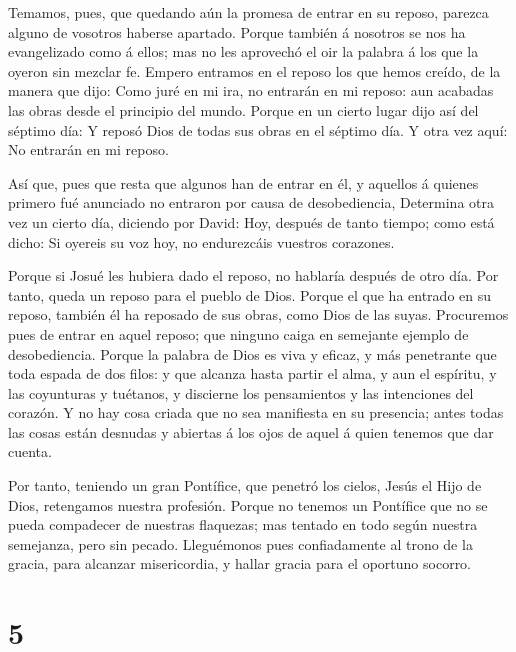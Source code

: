  Temamos, pues, que quedando aún la promesa de entrar en su
reposo, parezca alguno de vosotros haberse apartado.  Porque
también á nosotros se nos ha evangelizado como á ellos; mas no les
aprovechó el oir la palabra á los que la oyeron sin mezclar fe.
 Empero entramos en el reposo los que hemos creído, de la
manera que dijo: Como juré en mi ira, no entrarán en mi reposo: aun
acabadas las obras desde el principio del mundo.  Porque en
un cierto lugar dijo así del séptimo día: Y reposó Dios de todas sus
obras en el séptimo día.  Y otra vez aquí: No entrarán en mi
reposo.

 Así que, pues que resta que algunos han de entrar en él, y
aquellos á quienes primero fué anunciado no entraron por causa de
desobediencia,  Determina otra vez un cierto día, diciendo
por David: Hoy, después de tanto tiempo; como está dicho: Si oyereis su
voz hoy, no endurezcáis vuestros corazones.

 Porque si Josué les hubiera dado el reposo, no hablaría
después de otro día.  Por tanto, queda un reposo para el
pueblo de Dios.  Porque el que ha entrado en su reposo,
también él ha reposado de sus obras, como Dios de las suyas.
 Procuremos pues de entrar en aquel reposo; que ninguno
caiga en semejante ejemplo de desobediencia.  Porque la
palabra de Dios es viva y eficaz, y más penetrante que toda espada de
dos filos: y que alcanza hasta partir el alma, y aun el espíritu, y las
coyunturas y tuétanos, y discierne los pensamientos y las intenciones
del corazón.  Y no hay cosa criada que no sea manifiesta en
su presencia; antes todas las cosas están desnudas y abiertas á los ojos
de aquel á quien tenemos que dar cuenta.

 Por tanto, teniendo un gran Pontífice, que penetró los
cielos, Jesús el Hijo de Dios, retengamos nuestra profesión.
 Porque no tenemos un Pontífice que no se pueda compadecer
de nuestras flaquezas; mas tentado en todo según nuestra semejanza, pero
sin pecado.  Lleguémonos pues confiadamente al trono de la
gracia, para alcanzar misericordia, y hallar gracia para el oportuno
socorro.

\hypertarget{section-4}{%
\section{5}\label{section-4}}

